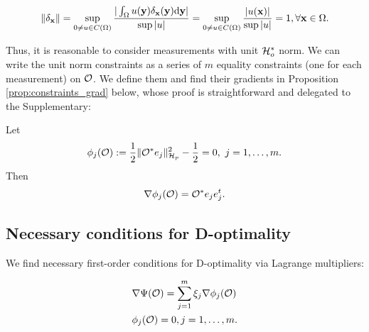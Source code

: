\begin{equation}
  \| \delta_{\x} \| = \sup_{0 \neq u \in C(\Omega)}
  \frac{
    |\int_{\Omega}u(\y) \delta_{\x}(\y) \der \y|
  }{
    \sup|u|
  } = \sup_{0 \neq u \in C(\Omega)} \frac{|u(\x)|}{\sup|u|} = 1,
  \forall \x \in \Omega.
\end{equation}

Thus, it is reasonable to consider measurements with unit $\mathcal{H}_o^*$
norm. We can write the unit norm constraints as a series of $m$
equality constraints (one for each measurement) on $\mathcal{O}$. We define
them and find their gradients in Proposition
\ref{prop:constraints_grad} below, whose proof is straightforward and
delegated to the Supplementary:

\begin{proposition}\label{prop:constraints_grad}
  Let
  \begin{align*}
    \phi_j(\obs) :=\frac12 \| \obs^* e_j\|_{\hilp}^2 - \frac12 = 0,\ j=1,\dots,m.
  \end{align*}
  Then
  \begin{equation*}
    \nabla \phi_j(\obs) = \obs^* e_je_j^t.
  \end{equation*}
\end{proposition}




\subsection{Necessary conditions for D-optimality}
We find necessary first-order conditions for D-optimality via Lagrange
multipliers:

\begin{align}
  &\nabla \tar(\obs) = \sum_{j=1}^m \xi_j \nabla \phi_j (\obs)
  \label{eq:Lagrange_mult1} \\
    &\phi_j(\obs) = 0, j = 1,\dots,m. \label{eq:Lagrange_mult2}
\end{align}


